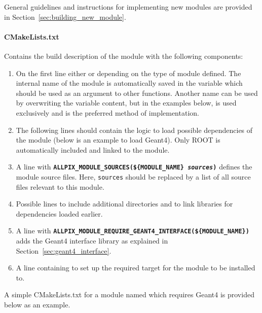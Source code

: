 General guidelines and instructions for implementing new modules are provided in Section~\ref{sec:building_new_module}.

\paragraph{CMakeLists.txt}
Contains the build description of the module with the following components:
\begin{enumerate}
\item On the first line either  or  depending on the type of module defined.
The internal name of the module is automatically saved in the variable  which should be used as an argument to other functions.
Another name can be used by overwriting the variable content, but in the examples below,  is used exclusively and is the preferred method of implementation.
\item The following lines should contain the logic to load possible dependencies of the module (below is an example to load Geant4).
Only ROOT is automatically included and linked to the module.
\item A line with \texttt{\textbf{ALLPIX\_MODULE\_SOURCES(\$\{MODULE\_NAME\} \textit{sources})}} defines the module source files. Here, \texttt{sources} should be replaced by a list of all source files relevant to this module.
\item Possible lines to include additional directories and to link libraries for dependencies loaded earlier.
\item A line with \texttt{\textbf{ALLPIX\_MODULE\_REQUIRE\_GEANT4\_INTERFACE(\$\{MODULE\_NAME\})}} adds the Geant4 interface library as explained in Section~\ref{sec:geant4_interface}.
\item A line containing  to set up the required target for the module to be installed to.
\end{enumerate}

A simple CMakeLists.txt for a module named  which requires Geant4 is provided below as an example.
\vspace{5pt}

